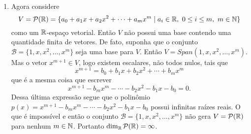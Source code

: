 \begin{exemplos}
\begin{enumerate}
    \item Agora considere
      \[
        V = \mathcal{P}(\mathbb{R}) = \{a_0 + a_1x + a_2x^2 + \cdots + a_mx^m \mid a_i \in \mathbb{R},\ 0 \le i \le m,\ m \in \mathbb{N}\}
      \]
      como um $\mathbb{R}$-espaço vetorial. Então $V$ não possui uma base contendo uma quantidade finita de vetores. De fato, suponha que o conjunto $\mathcal{B} = \{1, x, x^2, \dots, x^m\}$ seja uma base para $V$.
      Então $V = Span(1, x, x^2, \dots, x^m)$. Mas o vetor $x^{m + 1} \in V$, logo existem escalares, não todos nulos, tais que
      \[
        x^{m + 1} = b_0 + b_1x + b_2x^2 + \cdots + b_mx^m
      \]
      que é a mesma coisa que escrever
      \[
        x^{m + 1} - b_mx^m - \cdots - b_2x^2 - b_1x - b_0 = 0.
      \]
      Dessa última expressão segue que o polinômio $p(x) = x^{m + 1} - b_mx^m - \cdots - b_2x^2 - b_1x - b_0$ possui infinitas raízes reais. O que é impossível e então o
      conjunto $\mathcal{B} = \{1, x, x^2, \dots, x^m\}$ não gera $V = \mathcal{P}(\mathbb{R})$ para nenhum $m \in \mathbb{N}$. Portanto $\dim_{\mathbb{R}}\mathcal{P}(\mathbb{R}) = \infty$.
  \end{enumerate}
\end{exemplos}

